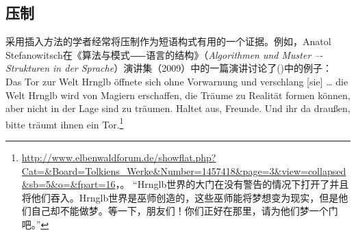 \subsection{压制}
\label{coercion-sec}
    采用插入方法的学者经常将压制作为短语构式有用的一个证据。例如，Anatol Stefanowitsch在《算法与模式⸺语言的结构》（\emph{Algorithmen und Muster –-
  Strukturen in der Sprache}）演讲集（2009）中的一篇演讲讨论了()中的例子：\ea
Das Tor zur Welt Hrnglb öffnete sich ohne Vorwarnung
und verschlang [sie] \ldots{} die Welt Hrnglb wird von Magiern
erschaffen, die Träume zu Realität formen können, aber
nicht in der Lage sind zu träumen. Haltet aus, Freunde.
Und ihr da draußen, bitte träumt ihnen ein Tor.\footnote{%
\url{http://www.elbenwaldforum.de/showflat.php?Cat=&Board=Tolkiens_Werke&Number=1457418&page=3&view=collapsed&sb=5&o=&fpart=16}，。
“Hrnglb世界的大门在没有警告的情况下打开了并且将他们吞入。Hrnglb世界是巫师创造的，这些巫师能将梦想变为现实，但是他们自己却不能做梦。等一下，朋友们！你们正好在那里，请为他们梦一个门吧。”
}
\z

